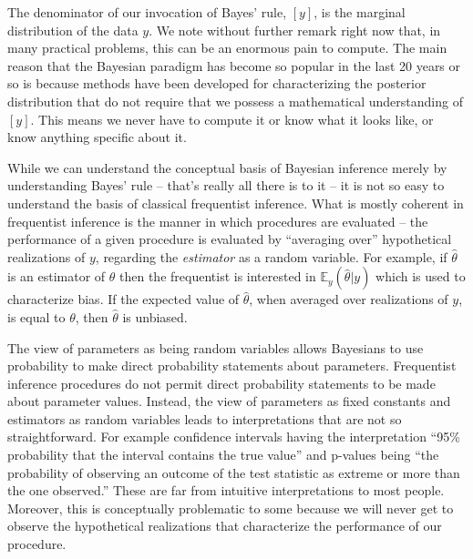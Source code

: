 The denominator of our invocation of Bayes' rule, $[y]$,
is the marginal distribution of the data $y$.  We note without further
remark right now that, in many practical problems, this can be an
enormous pain to compute. The main reason that the Bayesian paradigm
has become so popular in the last 20 years or so is because methods
have been developed
for characterizing the posterior distribution that do not
require that we possess a mathematical understanding of $[y]$. This means
we never have to compute it or know what it looks like, or know
anything specific about it.



While we can understand the conceptual basis of Bayesian inference
merely by understanding Bayes' rule -- that's really all there is to it
-- it is not so easy to understand the basis of classical
frequentist inference. 
What is mostly coherent
in frequentist inference is the manner in which procedures are evaluated -- the performance of a given procedure is
evaluated by ``averaging over'' hypothetical realizations of $y$,
regarding the {\it estimator} as a random variable. For example, if
$\hat{\theta}$ is an estimator of $\theta$ then the frequentist is
interested in $\mathbb{E}_{y}(\hat{\theta}|y)$ which is used to characterize
bias. If the expected value of $\hat{\theta}$, when averaged over
realizations of $y$, is equal to $\theta$, then $\hat{\theta}$ is
unbiased.

The view of parameters as being random variables 
allows Bayesians to use probability to make direct probability
statements about parameters. Frequentist inference procedures do not
permit direct probability statements to be made about parameter
values.
Instead, 
the view of parameters as fixed constants and estimators as random variables
leads to interpretations that are not so straightforward. For
example confidence intervals having the interpretation ``95\%
probability that the interval contains the true value'' and p-values
being ``the probability of observing an outcome of the test statistic as extreme or more than
the one observed.'' These are far from intuitive interpretations to
most people.  Moreover, this is conceptually problematic to some
because we will never get to observe the hypothetical realizations that characterize the
performance of our procedure.

